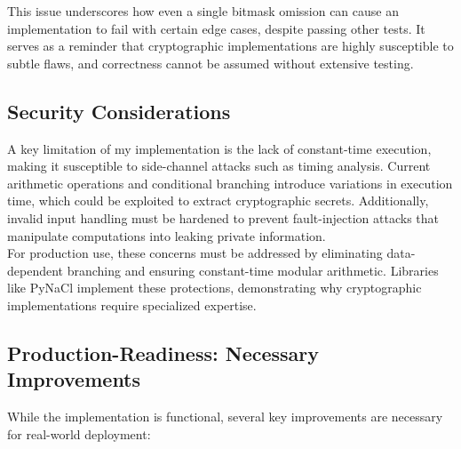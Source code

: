 \documentclass[twoside,a4paper,12pt]{article}
\begin{document}
This issue underscores how even a single bitmask omission can cause an implementation to fail with certain edge cases, despite passing other tests. It serves as a reminder that cryptographic implementations are highly susceptible to subtle flaws, and correctness cannot be assumed without extensive testing.

\subsection{Security Considerations}
\label{subsec:security}
A key limitation of my implementation is the lack of constant-time execution, making it susceptible to side-channel attacks such as timing analysis. Current arithmetic operations and conditional branching introduce variations in execution time, which could be exploited to extract cryptographic secrets. Additionally, invalid input handling must be hardened to prevent fault-injection attacks that manipulate computations into leaking private information. \\

For production use, these concerns must be addressed by eliminating data-dependent branching and ensuring constant-time modular arithmetic. Libraries like PyNaCl implement these protections, demonstrating why cryptographic implementations require specialized expertise.

\subsection{Production-Readiness: Necessary Improvements}
While the implementation is functional, several key improvements are necessary for real-world deployment:
\end{document}
